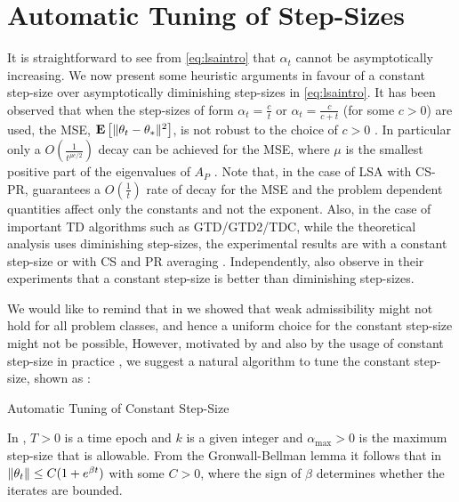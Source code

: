 \section{Automatic Tuning of Step-Sizes}
It is straightforward to see from \eqref{eq:lsaintro} that $\alpha_t$ cannot be asymptotically increasing. We now present some heuristic arguments in favour of a constant step-size over asymptotically diminishing step-sizes in \eqref{eq:lsaintro}.
It has been observed that when the step-sizes of form $\alpha_t=\frac{c}{t}$ or $\alpha_t=\frac{c}{c+t}$ (for some $c>0$) are used, the MSE, $\mathbf{E}\left[\| \theta_t-\theta_*\|^2\right]$, is not robust to the choice of $c>0$ \cite{korda-prashanth,bach-moulines}. In particular only a $O(\frac{1}{t^{{\mu c}/2}})$ decay can be achieved for the MSE, where $\mu$ is the smallest positive part of the eigenvalues of  $A_P$ \cite{bach-moulines}. Note that, in the case of LSA with CS-PR,  guarantees a $O(\frac{1}{t})$ rate of decay for the MSE and the problem dependent quantities affect only the constants and not the exponent. Also, in the case of important TD algorithms such as GTD/GTD2/TDC, while the theoretical analysis uses diminishing step-sizes, the experimental results are with a constant step-size or with CS and PR averaging \cite{gtd2,gtdmp}. Independently, \citet{dann} also observe in their experiments that a constant step-size is better than diminishing step-sizes.\par
We would like to remind that in  we showed that weak admissibility might not hold for all problem classes, and hence a uniform choice for the constant step-size might not be possible, However, motivated by  and also by the usage of constant step-size in practice \cite{dann,gtd2,gtdmp}, we suggest a natural algorithm to tune the constant step-size, shown as :
\begin{algorithm}[H]
\caption{Automatic Tuning of Constant Step-Size}
\begin{algorithmic}[1]
\ENDIF
\ENDFOR
\end{algorithmic}
\label{alg:tuning}
\end{algorithm}
In , $T>0$ is a time epoch and $k$ is a given integer and $\alpha_{\max}>0$ is the maximum step-size that is allowable. From the Gronwall-Bellman lemma it follows that in  $\left\| \theta_t\right\|\leq C(1+e^{\beta t})$ with some $C>0$, where the sign of $\beta$ determines whether the iterates are bounded. 
